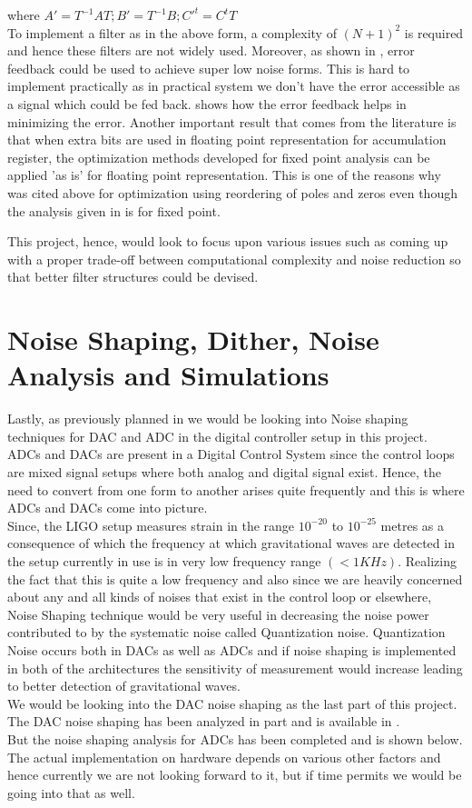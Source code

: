 \documentclass[colorlinks=true,pdfstartview=FitV,linkcolor=blue,
            citecolor=red,urlcolor=magenta]{ligodoc}
\begin{document}
where $A'=T^{-1}AT; B'=T^{-1}B; C'^{t}=C^{t}T$
\\To implement a filter as in the above form, a complexity of $(N+1)^{2}$ is required and hence these filters are not widely used. Moreover, as shown in \cite{ErrorFeedback}, error feedback could be used to achieve super low noise forms. This is hard to implement practically as in practical system we don't have the error accessible as a signal which could be fed back. \cite{HelpfulFeedback} shows how the error feedback helps in minimizing the error.
Another important result that comes from the literature is that when extra bits are used in floating point representation for accumulation register, the optimization methods developed for fixed point analysis can be applied 'as is' for floating point representation\cite{optimize}. This is one of the reasons why \cite{Dehner} was cited above for optimization using reordering of poles and zeros even though the analysis given in \cite{Dehner} is for fixed point.

This project, hence, would look to focus upon various issues such as coming up with a proper trade-off between computational complexity and noise reduction so that better filter structures could be devised.
\section{Noise Shaping, Dither, Noise Analysis and Simulations}
Lastly, as previously planned in \cite{ProjectProposal} we would be looking into Noise shaping techniques for DAC and ADC in the digital controller setup in this project. ADCs and DACs are present in a Digital Control System since the control loops are mixed signal setups where both analog and digital signal exist. Hence, the need to convert from one form to another arises quite frequently and this is where ADCs and DACs come into picture. \\
Since, the LIGO setup measures strain in the range $10^{-20}$ to $10^{-25}$ metres as a consequence of which the frequency at which gravitational waves are detected in the setup currently in use is in  very low frequency range $(<1KHz)$. Realizing the fact that this is quite a low frequency and also since we are heavily concerned about any and all kinds of noises that exist in the control loop or elsewhere, Noise Shaping technique would be very useful in decreasing the noise power contributed to by the systematic noise called Quantization noise. Quantization Noise occurs both in DACs as well as ADCs and if noise shaping is implemented in both of the architectures the sensitivity of measurement would increase leading to better detection of gravitational waves.\\
We would be looking into the DAC noise shaping as the last part of this project. The DAC noise shaping has been analyzed in part and is available in \cite{ProjectProposal}. \\ But the noise shaping analysis for ADCs has been completed and is shown below. The actual implementation on hardware depends on various other factors and hence currently we are not looking forward to it, but if time permits we would be going into that as well.  \\
 
\end{document}

